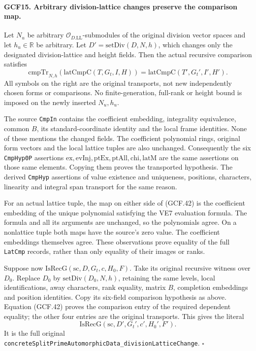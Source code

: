 \documentclass[11pt,a4paper]{article}
\numberwithin{equation}{section}
\theoremstyle{remark}\newtheorem{remark}[theorem]{Remark}
\begin{document}
\paragraph{GCF15. Arbitrary division-lattice changes preserve the comparison map.}
\label{claim:GCF15}
Let \(N_u\) be arbitrary \(\mathcal O_{D.\mathrm{LL}}\)-submodules
of the original division vector spaces and let \(h_u\in\mathbb R\)
be arbitrary.  Let \(D'=\mathrm{setDiv}(D,N,h)\), which changes
only the designated division-lattice and height fields.  Then the
actual recursive comparison satisfies
\[
 \mathrm{cmpTr}_{N,h}(\mathrm{latCmpC}(T,G_t,I,H))
   =\mathrm{latCmpC}(T',G_t',I',H').                  \tag{GCF.42}
\]
All symbols on the right are the original transports, not new
independently chosen forms or comparisons.  No finite-generation,
full-rank or height bound is imposed on the newly inserted \(N_u,h_u\).

The source \texttt{Cmp\allowbreak In} contains the coefficient embedding,
integrality equivalence, common \(B\), its standard-coordinate
identity and the local frame identities.  None of these mentions
the changed fields.  The coefficient polynomial rings, original
form vectors and the local lattice tuples are also unchanged.
Consequently the six \texttt{Cmp\allowbreak Hyp0P} assertions
\(\mathrm{ex},\mathrm{evInj},\mathrm{ptEx},\mathrm{ptAll},
\mathrm{chi},\mathrm{latM}\) are the same assertions on those
same elements.  Copying them proves the transported hypothesis.
The derived \texttt{Cmp\allowbreak Hyp} assertions of value existence and
uniqueness, positions, characters, linearity and integral span
transport for the same reason.

For an actual lattice tuple, the map on either side of (GCF.42)
is the coefficient embedding of the unique polynomial satisfying
the VE7 evaluation formula.  The formula and all its arguments are
unchanged, so the polynomials agree.  On a nonlattice tuple both
maps have the source's zero value.  The coefficient embeddings
themselves agree.  These observations prove equality of the full
\texttt{Lat\allowbreak Cmp} records, rather than only equality of their images
or ranks.

Suppose now \(\mathrm{IsRecG}(\mathrm{sc},D,G_t,c,H_0,F)\).
Take its original recursive witness over \(D_0\).  Replace \(D_0\)
by \(\mathrm{setDiv}(D_0,N,h)\), retaining the same levels,
local identifications, away characters, rank equality, matrix \(B\),
completion embeddings and position identities.  Copy its six-field
comparison hypothesis as above.  Equation (GCF.42) proves the
comparison entry of the required dependent equality; the other four
entries are the original transports.  This gives the literal
\[
 \mathrm{IsRecG}(\mathrm{sc},D',G_t',c',H_0',F').        \tag{GCF.43}
\]
It is the full original
\texttt{concrete\allowbreak Split\allowbreak Prime\allowbreak Automorphic\allowbreak Data\_\allowbreak division\allowbreak Lattice\allowbreak Change}.
\hfill\(\square\)
\end{document}
